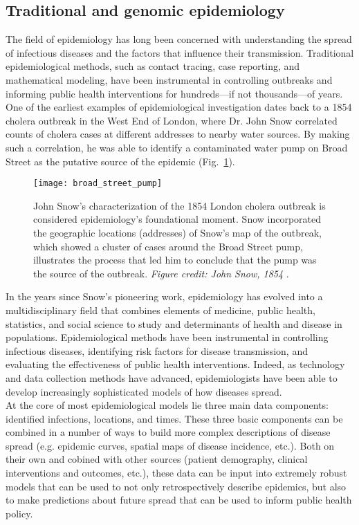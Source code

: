 \subsection{Traditional and genomic epidemiology}\label{sec:tradVsGenEpi}
The field of epidemiology has long been concerned with understanding the spread of infectious diseases and the factors that influence their transmission.
Traditional epidemiological methods, such as contact tracing, case reporting, and mathematical modeling, have been instrumental in controlling outbreaks and informing public health interventions for hundreds---if not thousands---of years.
One of the earliest examples of epidemiological investigation dates back to a 1854 cholera outbreak in the West End of London, where Dr. John Snow correlated counts of cholera cases at different addresses to nearby water sources.
By making such a correlation, he was able to identify a contaminated water pump on Broad Street as the putative source of the epidemic (Fig.~\ref{fig:broadStreetPump}).\\

\begin{figure}[ht]
  \centering
  \texttt{[image: broad\_street\_pump]}
  \caption[John Snow's map of the 1854 Broad Street cholera outbreak in London]{John Snow's characterization of the 1854 London cholera outbreak is considered epidemiology's foundational moment. Snow incorporated the geographic locations (addresses) of Snow's map of the outbreak, which showed a cluster of cases around the Broad Street pump, illustrates the process that led him to conclude that the pump was the source of the outbreak. \textit{Figure credit: John Snow, 1854} \citep{broadStreetPump_map}.}
  \label{fig:broadStreetPump}
\end{figure}

In the years since Snow's pioneering work, epidemiology has evolved into a multidisciplinary field that combines elements of medicine, public health, statistics, and social science to study and determinants of health and disease in populations.
Epidemiological methods have been instrumental in controlling infectious diseases, identifying risk factors for disease transmission, and evaluating the effectiveness of public health interventions.
Indeed, as technology and data collection methods have advanced, epidemiologists have been able to develop increasingly sophisticated models of how diseases spread.\\

At the core of most epidemiological models lie three main data components: identified infections, locations, and times.
These three basic components can be combined in a number of ways to build more complex descriptions of disease spread (e.g. epidemic curves, spatial maps of disease incidence, etc.).
Both on their own and cobined with other sources (patient demography, clinical interventions and outcomes, etc.), these data can be input into extremely robust models that can be used to not only retrospectively describe epidemics, but also to make predictions about future spread that can be used to inform public health policy.\\

